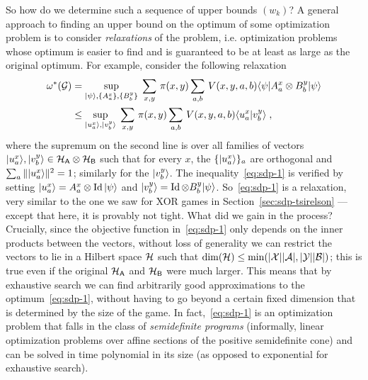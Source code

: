 So how do we determine such a sequence of upper bounds $(w_k)$?
A general approach to finding an upper bound on the optimum of some optimization problem is to consider \emph{relaxations} of the problem, i.e.
 optimization problems whose optimum is easier to find and is guaranteed to be at least as large as the original optimum. For example, consider the following relaxation
\begin{align}
\omega^*(\mathcal{G}) &=\sup_{|\psi\rangle, \{A^x_a\},\{B^y_b\}} \; \sum_{x,y}\, \pi(x,y) \sum_{a,b} \,V(x,y,a,b) \langle\psi| A^x_a \otimes B^y_b |\psi\rangle\notag \\
&\leq \sup_{|u^x_a\rangle,|v^y_b\rangle }\; \sum_{x,y} \,\pi(x,y) \sum_{a,b}\, V(x,y,a,b) \langle u^x_a | v^y_b\rangle\;,\label{eq:sdp-1}
\end{align}
where the supremum on the second line is over all families of vectors $|u^x_a\rangle,|v^y_b\rangle \in \mathcal{H}_{\textsf{A}}\otimes \mathcal{H}_{\textsf{B}}$ such that for every $x$, the $\{|u^x_a\rangle\}_a$ are orthogonal and $\sum_a \||u^x_a\rangle\|^2 = 1$; similarly for the $|v^y_b\rangle$. The inequality~\eqref{eq:sdp-1} is verified by setting $|u^x_a\rangle = A^x_a \otimes \mathop{\rm Id}\nolimits |\psi\rangle$ and $|v^y_b\rangle = \mathop{\rm Id}\nolimits \otimes B^y_b |\psi\rangle$. So~\eqref{eq:sdp-1} is a relaxation, very similar to the one we saw for XOR games in Section~\ref{sec:sdp-tsirelson} --- except that here, it is provably not tight. What did we gain in the process? Crucially, since the objective function in~\eqref{eq:sdp-1} only depends on the inner products between the vectors, without loss of generality we can restrict the vectors to lie in a Hilbert space $\mathcal{H}$ such that $\dim(\mathcal{H}) \leq \min( |\mathcal{X}||\mathcal{A}|,|\mathcal{Y}||\mathcal{B}|)$; this is true even if the original $\mathcal{H}_{\textsf{A}}$ and $\mathcal{H}_{\textsf{B}}$ were much larger. This means that by exhaustive search we can find arbitrarily good approximations to the optimum~\eqref{eq:sdp-1}, without having to go beyond a certain fixed dimension that is determined by the size of the game. In fact,~\eqref{eq:sdp-1} is an optimization problem that falls in the class of \emph{semidefinite programs} (informally, linear optimization problems over affine sections of the positive semidefinite cone) and can be solved in time polynomial in its size (as opposed to exponential for exhaustive search). 

